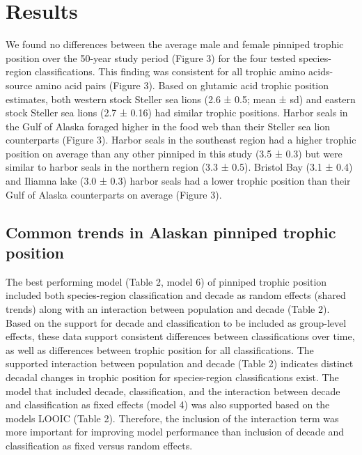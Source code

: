 \documentclass [11pt, proquest] {uwthesis}[2015/03/03]
\begin{document}
\section{Results}\label{results-2}

We found no differences between the average male and female pinniped
trophic position over the 50-year study period (Figure 3) for the four
tested species-region classifications. This finding was consistent for
all trophic amino acids-source amino acid pairs (Figure 3). Based on
glutamic acid trophic position estimates, both western stock Steller sea
lions (2.6 ± 0.5; mean ± sd) and eastern stock Steller sea lions (2.7 ±
0.16) had similar trophic positions. Harbor seals in the Gulf of Alaska
foraged higher in the food web than their Steller sea lion counterparts
(Figure 3). Harbor seals in the southeast region had a higher trophic
position on average than any other pinniped in this study (3.5 ± 0.3)
but were similar to harbor seals in the northern region (3.3 ± 0.5).
Bristol Bay (3.1 ± 0.4) and Iliamna lake (3.0 ± 0.3) harbor seals had a
lower trophic position than their Gulf of Alaska counterparts on average
(Figure 3).

\subsection{Common trends in Alaskan pinniped trophic
position}\label{common-trends-in-alaskan-pinniped-trophic-position}

The best performing model (Table 2, model 6) of pinniped trophic
position included both species-region classification and decade as
random effects (shared trends) along with an interaction between
population and decade (Table 2). Based on the support for decade and
classification to be included as group-level effects, these data support
consistent differences between classifications over time, as well as
differences between trophic position for all classifications. The
supported interaction between population and decade (Table 2) indicates
distinct decadal changes in trophic position for species-region
classifications exist. The model that included decade, classification,
and the interaction between decade and classification as fixed effects
(model 4) was also supported based on the models LOOIC (Table 2).
Therefore, the inclusion of the interaction term was more important for
improving model performance than inclusion of decade and classification
as fixed versus random effects.
\end{document}
